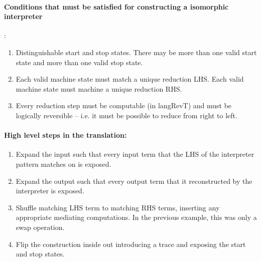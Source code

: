 \documentclass{llncs}
\begin{document}
{\paragraph*{Conditions that must be satisfied for constructing a isomorphic
interpreter}:

\begin{enumerate}

\item Distinguishable start and stop states. There may be more than one
  valid start state and more than one valid stop state.

\item Each valid machine state must match a unique reduction LHS. Each
  valid machine state must machine a unique reduction RHS.

\item Every reduction step must be computable (in {{langRevT}}) and
  must be logically reversible -- i.e. it must be possible to reduce
  from right to left.

\end{enumerate}


\paragraph*{High level steps in the translation:}
\label{sec:steps}

\begin{enumerate}
\item Expand the input such that every input term that the LHS of the
  interpreter pattern matches on is exposed.

\item Expand the output such that every output term that it
  reconstructed by the interpreter is exposed.

\item Shuffle matching LHS term to matching RHS terms, inserting any
  appropriate mediating computations. In the previous example, this
  was only a swap operation.

\item Flip the construction inside out introducing a {{trace}} and
  exposing the start and stop states. 

\end{enumerate}



}
\end{document}
